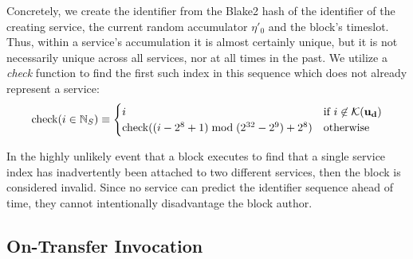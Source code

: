 Concretely, we create the identifier from the Blake2 hash of the identifier of the creating service, the current random accumulator $\eta'_0$ and the block's timeslot. Thus, within a service's accumulation it is almost certainly unique, but it is not necessarily unique across all services, nor at all times in the past. We utilize a \emph{check} function to find the first such index in this sequence which does not already represent a service:
\begin{equation}
  \text{check}(i \in \mathbb{N}_S) \equiv \begin{cases}
    i &\text{if } i \not\in \mathcal{K}(\mathbf{u}_\mathbf{d}) \\
    \text{check}((i - 2^8 + 1) \bmod (2^{32}-2^9) + 2^8)&\text{otherwise}
  \end{cases}
\end{equation}

\nb In the highly unlikely event that a block executes to find that a single service index has inadvertently been attached to two different services, then the block is considered invalid. Since no service can predict the identifier sequence ahead of time, they cannot intentionally disadvantage the block author.

\subsection{On-Transfer Invocation}\label{sec:ontransferinvocation}

